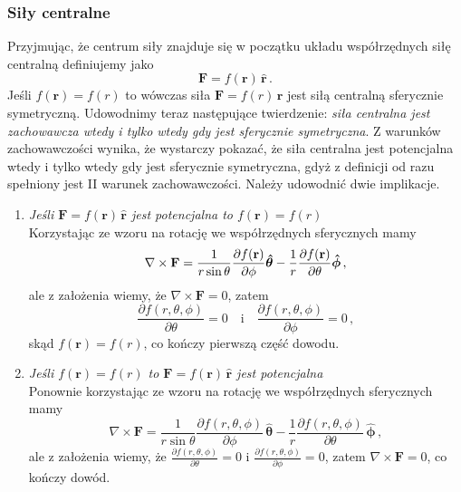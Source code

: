 \documentclass[../main.tex]{subfiles}
\begin{document}
\subsubsection{Siły centralne}
Przyjmując, że centrum siły znajduje się w początku układu współrzędnych siłę centralną definiujemy jako
\begin{equation*}
    \mathbf{F}=f(\mathbf{r})\,\mathbf{\hat r}\,.
\end{equation*}
Jeśli \(f(\mathbf{r})=f(r)\) to wówczas siła \(\mathbf{F}=f(r)\,\mathbf{\hat r}\) jest siłą centralną sferycznie symetryczną. Udowodnimy teraz następujące twierdzenie: \textit{siła centralna jest zachowawcza wtedy i tylko wtedy gdy jest sferycznie symetryczna}. Z warunków zachowawczości wynika, że wystarczy pokazać, że siła centralna jest potencjalna wtedy i tylko wtedy gdy jest sferycznie symetryczna, gdyż z definicji od razu spełniony jest II warunek zachowawczości. Należy udowodnić dwie implikacje.
\begin{enumerate}
    \item \textit{Jeśli \(\mathbf{F}=f(\mathbf{r})\,\mathbf{\hat r}\) jest potencjalna to \(f(\mathbf{r})=f(r)\)}\\
    Korzystając ze wzoru na rotację we współrzędnych sferycznych mamy
    \begin{equation*}
        \nabla\times\mathbf{F}=\frac{1}{r\sin\theta}\pdv{f(\mathbf{r})}{\phi}\boldsymbol{\hat\theta}-\frac{1}{r}\pdv{f(\mathbf{r})}{\theta}\boldsymbol{\hat \phi}\,,
    \end{equation*}
    ale z założenia wiemy, że \(\nabla\times\mathbf{F}=0\), zatem 
\begin{equation*}
    \frac{\partial f(r,\theta,\phi)}{\partial \theta}=0\quad\text{i}\quad \frac{\partial f(r,\theta,\phi)}{\partial \phi}=0\,,
\end{equation*}
skąd \(f(\mathbf{r})=f(r)\), co kończy pierwszą część dowodu.

\item \textit{Jeśli \(f(\mathbf{r})=f(r)\) to \(\mathbf{F}=f(\mathbf{r})\,\mathbf{\hat r}\) jest potencjalna}\\
Ponownie korzystając ze wzoru na rotację we współrzędnych sferycznych mamy
    \begin{equation*}
        \nabla\times\mathbf{F}=\frac{1}{r\sin\theta}\frac{\partial f(r,\theta,\phi)}{\partial \phi}\,\boldsymbol{\hat\theta}-\frac{1}{r}\frac{\partial f(r,\theta,\phi)}{\partial \theta}\,\boldsymbol{\hat \phi}\,,
    \end{equation*}
     ale z założenia wiemy, że \(\frac{\partial f(r,\theta,\phi)}{\partial \theta}=0\) i \(\frac{\partial f(r,\theta,\phi)}{\partial \phi}=0\), zatem \(\nabla\times\mathbf{F}=0\), co kończy dowód.
\end{enumerate}
\end{document}
